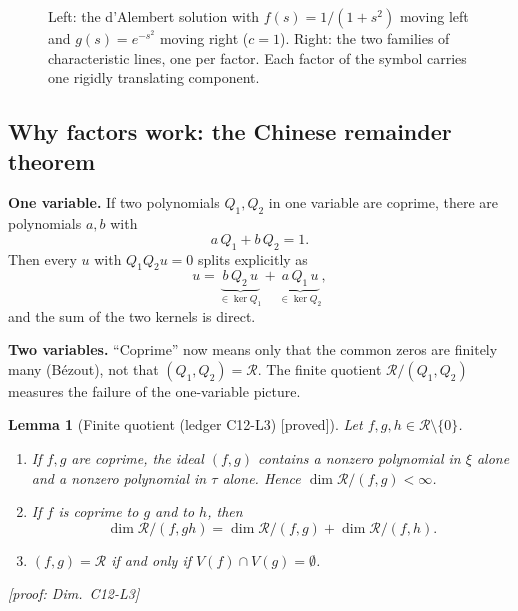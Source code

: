 \documentclass[11pt]{article}
\theoremstyle{plain}
\newtheorem{lemma}[theorem]{Lemma}
\theoremstyle{definition}
\theoremstyle{remark}
\newcommand{\ring}{\mathcal{R}}            %
\newcommand{\Var}{V}                        %
\DeclareMathOperator{\dimc}{dim}
\newcommand{\badge}[2]{\textcolor{#1}{\textsf{\footnotesize[#2]}}}
\newcommand{\proved}[1][]{\badge{cC}{proved#1}}
\newcommand{\led}[1]{\textcolor{cG}{\textsf{\footnotesize(ledger #1)}}}
\newcommand{\dimref}[1]{\textsf{\footnotesize[proof: Dim.~#1]}}
\begin{document}
\begin{figure}[!htb]
\centering
{}
\hfill
{}
\caption{Left: the d'Alembert solution with $f(s)=1/(1+s^2)$ moving left and $g(s)=e^{-s^2}$ moving right ($c=1$). Right: the two families of characteristic lines, one per factor. Each factor of the symbol carries one rigidly translating component.}\label{fig:wave}
\end{figure}

\subsection{Why factors work: the Chinese remainder theorem}

\textbf{One variable.} If two polynomials $Q_1,Q_2$ in one variable are coprime, there are polynomials $a,b$ with
\[
a\,Q_1+b\,Q_2=1 .
\]
Then every $u$ with $Q_1Q_2u=0$ splits explicitly as
\[
u=\underbrace{b\,Q_2\,u}_{\in\ker Q_1}+\underbrace{a\,Q_1\,u}_{\in\ker Q_2},
\]
and the sum of the two kernels is direct.

\textbf{Two variables.} ``Coprime'' now means only that the common zeros are finitely many (B\'ezout), not that $(Q_1,Q_2)=\ring$. The finite quotient $\ring/(Q_1,Q_2)$ measures the failure of the one-variable picture.

\begin{lemma}[{Finite quotient \led{C12-L3} \proved}]\label{lem:C12L3}
Let $f,g,h\in\ring\setminus\{0\}$.
\begin{enumerate}[label=(\alph*)]
\item If $f,g$ are coprime, the ideal $(f,g)$ contains a nonzero polynomial in $\xi$ alone and a nonzero polynomial in $\tau$ alone. Hence $\dimc\ring/(f,g)<\infty$.
\item If $f$ is coprime to $g$ and to $h$, then
\[
\dimc\ring/(f,gh)=\dimc\ring/(f,g)+\dimc\ring/(f,h).
\]
\item $(f,g)=\ring$ if and only if $\Var(f)\cap\Var(g)=\emptyset$.
\end{enumerate}
\dimref{C12-L3}
\end{lemma}
\end{document}
